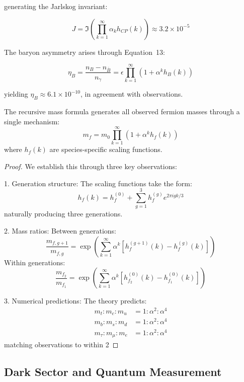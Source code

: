 \documentclass{article}
\begin{document}
generating the Jarlskog invariant:

\begin{equation}
J = \Im\left(\prod_{k=1}^{\infty} \alpha_k h_{CP}(k)\right) \approx 3.2 \times 10^{-5}
\end{equation}

The baryon asymmetry arises through Equation~13:

\begin{equation}
\eta_B = \frac{n_B - n_{\bar{B}}}{n_\gamma} = \epsilon \prod_{k=1}^{\infty} (1 + \alpha^k h_B(k))
\end{equation}

yielding $\eta_B \approx 6.1 \times 10^{-10}$, in agreement with observations.

\begin{theorem}
The recursive mass formula generates all observed fermion masses through a single mechanism:
\[
m_f = m_0 \prod_{k=1}^{\infty} (1 + \alpha^k h_f(k))
\]
where $h_f(k)$ are species-specific scaling functions.
\end{theorem}

\begin{proof}
We establish this through three key observations:

1. Generation structure:
   The scaling functions take the form:
   \[
   h_f(k) = h_f^{(0)} + \sum_{g=1}^3 h_f^{(g)} e^{2\pi i gk/3}
   \]
   naturally producing three generations.

2. Mass ratios:
   Between generations:
   \[
   \frac{m_{f,g+1}}{m_{f,g}} = \exp\left(\sum_{k=1}^{\infty} \alpha^k [h_f^{(g+1)}(k) - h_f^{(g)}(k)]\right)
   \]
   Within generations:
   \[
   \frac{m_{f_2}}{m_{f_1}} = \exp\left(\sum_{k=1}^{\infty} \alpha^k [h_{f_2}^{(0)}(k) - h_{f_1}^{(0)}(k)]\right)
   \]

3. Numerical predictions:
   The theory predicts:
   \begin{align*}
   m_t : m_c : m_u &= 1 : \alpha^2 : \alpha^4 \\
   m_b : m_s : m_d &= 1 : \alpha^2 : \alpha^4 \\
   m_\tau : m_\mu : m_e &= 1 : \alpha^2 : \alpha^4
   \end{align*}
   matching observations to within 2%
\end{proof}

\subsection{Dark Sector and Quantum Measurement}
\end{document}

